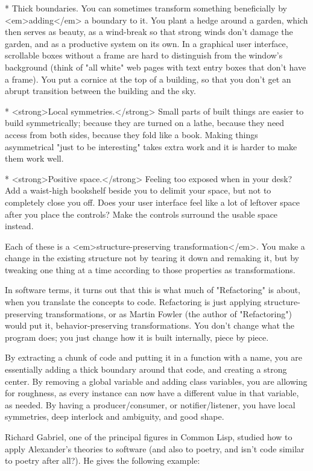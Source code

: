 * Thick boundaries. You can sometimes transform something beneficially by <em>adding</em> a boundary to it.  You plant a hedge around a garden, which then serves as beauty, as a wind-break so that strong winds don't damage the garden, and as a productive system on its own. In a graphical user interface, scrollable boxes without a frame are hard to distinguish from the window's background (think of "all white" web pages with text entry boxes that don't have a frame).  You put a cornice at the top of a building, so that you don't get an abrupt transition between the building and the sky.

* <strong>Local symmetries.</strong> Small parts of built things are easier to build symmetrically; because they are turned on a lathe, because they need access from both sides, because they fold like a book.  Making things asymmetrical "just to be interesting" takes extra work and it is harder to make them work well.

* <strong>Positive space.</strong> Feeling too exposed when in your desk?  Add a waist-high bookshelf beside you to delimit your space, but not to completely close you off.  Does your user interface feel like a lot of leftover space after you place the controls?  Make the controls surround the usable space instead.

Each of these is a <em>structure-preserving transformation</em>. You make a change in the existing structure not by tearing it down and remaking it, but by tweaking one thing at a time according to those properties as transformations.

In software terms, it turns out that this is what much of "Refactoring" is about, when you translate the concepts to code. Refactoring is just applying structure-preserving transformations, or as Martin Fowler (the author of "Refactoring") would put it, behavior-preserving transformations.  You don't change what the program does; you just change how it is built internally, piece by piece.

By extracting a chunk of code and putting it in a function with a name, you are essentially adding a thick boundary around that code, and creating a strong center.  By removing a global variable and adding class variables, you are allowing for roughness, as every instance can now have a different value in that variable, as needed. By having a producer/consumer, or notifier/listener, you have local symmetries, deep interlock and ambiguity, and good shape.

Richard Gabriel, one of the principal figures in Common Lisp, studied how to apply Alexander's theories to software (and also to poetry, and isn't code similar to poetry after all?).  He gives the following example:

